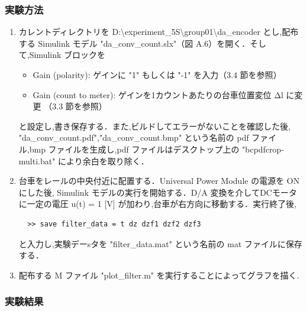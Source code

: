 \subsubsection{実験方法}
\begin{enumerate}
  \item カレントディレクトリを D:\textbackslash experiment\_5S\textbackslash group01\textbackslash da\_encoder とし,配布する Simulink モデル "da\_conv\_count.slx"（図 A.6）を開く．そして,Simulink ブロックを
        \begin{itemize}
          \item Gain (polarity): ゲインに "1" もしくは "-1" を入力（3.4 節を参照）
          \item Gain (count to meter): ゲインを1カウントあたりの台車位置変位 Δl に変更
                （3.3 節を参照）
        \end{itemize}
        
        と設定し,書き保存する．また,ビルドしてエラーがないことを確認した後,
        "da\_conv\_count.pdf","da\_conv\_count.bmp" という名前の 
        pdf ファイル,bmp ファイルを生成し,pdf ファイルはデスクトップ上の 
        "bcpdfcrop-multi.bat" により余白を取り除く．
        
  \item 台車をレールの中央付近に配置する．Universal Power Module の電源を ON にした後,
        Simulink モデルの実行を開始する．D/A 変換を介してDCモータに一定の電圧 
        u(t) = 1 [V] が加わり,台車が右方向に移動する．実行終了後,
        
        \begin{tcolorbox}[colback=gray!5!white,colframe=gray!75!black]
          \begin{lstlisting}
  >> save filter_data = t dz dzf1 dzf2 dzf3
  \end{lstlisting}
        \end{tcolorbox}
        
        と入力し,実験デーsタを "filter\_data.mat" という名前の mat ファイルに保存する．
        
  \item 配布する M ファイル "plot\_filter.m" を実行することによってグラフを描く.
\end{enumerate}

\subsubsection{実験結果}

